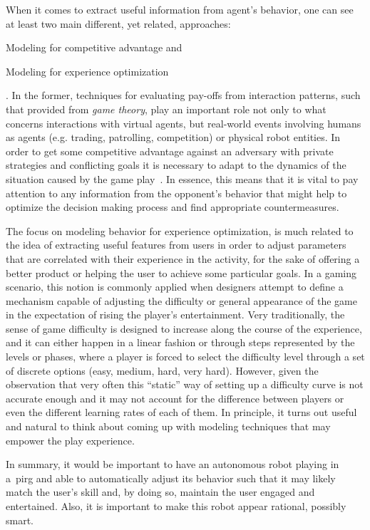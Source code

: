 When it comes to extract useful information from agent's behavior, one can see at least two main different, yet related, approaches: \begin{inparaenum}\item Modeling for competitive advantage and \item Modeling for experience optimization\end{inparaenum}. In the former, techniques for evaluating pay-offs from interaction patterns, such that provided from \textit{game theory}, play an important role not only to what concerns interactions with virtual agents, but real-world events involving humans as agents (e.g. trading, patrolling, competition) or physical robot entities. In order to get some competitive advantage against an adversary with private strategies and conflicting goals it is necessary to adapt to the dynamics of the situation caused by the game play~\citep{rofer_overview_2012}. In essence, this means that it is vital to pay attention to any information from the opponent's behavior that might help to optimize the decision making process and find appropriate countermeasures.

The focus on modeling behavior for experience optimization, is much related to the idea of extracting useful features from users in order to adjust parameters that are correlated with their experience in the activity, for the sake of offering a better product or helping the user to achieve some particular goals. In a gaming scenario, this notion is commonly applied when designers attempt to define a mechanism capable of adjusting the difficulty or general appearance of the game in the expectation of rising the player's entertainment. Very traditionally, the sense of game difficulty is designed to increase along the course of the experience, and it can either happen in a linear fashion or through steps represented by the levels or phases, where a player is forced to select the difficulty level through a set of discrete options (easy, medium, hard, very hard). However, given the observation that very often this ``static'' way of setting up a difficulty curve is not accurate enough and it may not account for the difference between players or even the different learning rates of each of them. In principle, it turns out useful and natural to think about coming up with modeling techniques that may empower the play experience. 

In summary, it would be important to have an autonomous robot playing in a~\gls{pirg} and able to automatically adjust its behavior such that it may likely match the user's skill and, by doing so, maintain the user engaged and entertained. Also, it is important to make this robot appear rational, possibly smart. 


